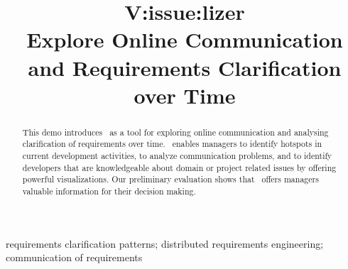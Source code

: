 
\title{V:issue:lizer\\Explore Online Communication and  Requirements Clarification over Time}


\author{
}

\maketitle


\begin{abstract}
This demo introduces \viss\ as a tool for exploring online communication and analysing clarification of requirements over time.
\viss\ enables managers to identify hotspots in current development activities, to analyze communication problems, and to identify developers that are knowledgeable about domain or project related issues by offering powerful visualizations.
Our preliminary evaluation shows that \viss\ offers managers valuable information for their decision making.
\end{abstract}

\begin{IEEEkeywords}
requirements clarification patterns; distributed requirements engineering; communication of requirements
\end{IEEEkeywords}
